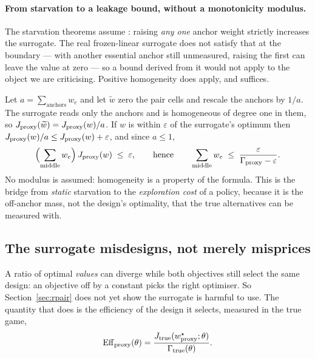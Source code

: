 

\paragraph{From starvation to a leakage bound, without a monotonicity modulus.}
The starvation theorems assume : raising \emph{any one} anchor weight
strictly increases the surrogate. The real frozen-linear surrogate does not satisfy that
at the boundary --- with another essential anchor still unmeasured, raising the first can
leave the value at zero --- so a bound derived from it would not apply to the object we
are criticising. Positive homogeneity does apply, and suffices.

Let $a=\sum_{\text{anchors}}w_{e}$ and let $\widetilde w$ zero the pair cells and rescale
the anchors by $1/a$. The surrogate reads only the anchors and is homogeneous of degree
one in them, so $J_{\rm proxy}(\widetilde w)=J_{\rm proxy}(w)/a$. If $w$ is within
$\varepsilon$ of the surrogate's optimum then $J_{\rm proxy}(w)/a\le J_{\rm proxy}(w)+
\varepsilon$, and since $a\le1$,
\[
\Bigl(\sum_{\text{middle}}w_{e}\Bigr)\,J_{\rm proxy}(w)\;\le\;\varepsilon,
\qquad\text{hence}\qquad
\sum_{\text{middle}}w_{e}\;\le\;\frac{\varepsilon}{\Gamma_{\rm proxy}-\varepsilon}.
\]
No modulus is assumed: homogeneity is a property of the formula. This is the bridge from
\emph{static} starvation to the \emph{exploration cost} of a policy, because it is the
off-anchor mass, not the design's optimality, that the true alternatives can be measured
with.


\subsection{The surrogate misdesigns, not merely misprices}
\label{sec:alloc}

A ratio of optimal \emph{values} can diverge while both objectives still select the same
design: an objective off by a constant picks the right optimiser. So
Section~\ref{sec:rpair} does not yet show the surrogate is harmful to use. The quantity
that does is the efficiency of the design it selects, measured in the true game,
\[
\mathrm{Eff}_{\rm proxy}(\theta)
=\frac{J_{\rm true}(w^{\star}_{\rm proxy};\theta)}{\Gamma_{\rm true}(\theta)} .
\]

